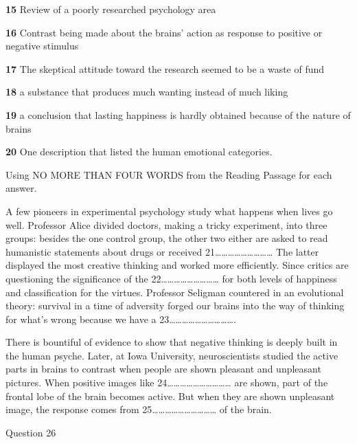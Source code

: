 \documentclass{../templateReading/cdreading}
\begin{document}
\textbf{15} Review of a poorly researched psychology area

\textbf{16} Contrast being made about the brains’ action as response to positive or negative stimulus

\textbf{17} The skeptical attitude toward the research seemed to be a waste of fund

\textbf{18} a substance that produces much wanting instead of much liking

\textbf{19} a conclusion that lasting happiness is hardly obtained because of the nature of brains

\textbf{20} One description that listed the human emotional categories.



Using NO MORE THAN FOUR WORDS from the Reading Passage for each answer.


A few pioneers in experimental psychology study what happens when lives go well. Professor Alice divided doctors, making a tricky experiment, into three groups: besides the one control group, the other two either are asked to read humanistic statements about drugs or received 21……………………… The latter displayed the most creative thinking and worked more efficiently. Since critics are questioning the significance of the 22……………………… for both levels of happiness and classification for the virtues. Professor Seligman countered in an evolutional theory: survival in a time of adversity forged our brains into the way of thinking for what’s wrong because we have a 23………………………….

There is bountiful of evidence to show that negative thinking is deeply built in the human psyche. Later, at Iowa University, neuroscientists studied the active parts in brains to contrast when people are shown pleasant and unpleasant pictures. When positive images like 24………………………… are shown, part of the frontal lobe of the brain becomes active. But when they are shown unpleasant image, the response comes from 25………………………… of the brain.

Question 26


\end{document}
